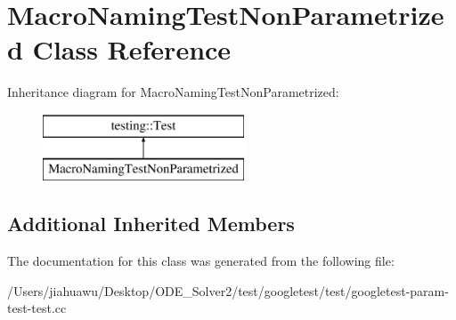 \hypertarget{class_macro_naming_test_non_parametrized}{}\section{Macro\+Naming\+Test\+Non\+Parametrized Class Reference}
\label{class_macro_naming_test_non_parametrized}
Inheritance diagram for Macro\+Naming\+Test\+Non\+Parametrized\+:\begin{figure}[H]
\begin{center}
\leavevmode
\includegraphics[height=2.000000cm]{class_macro_naming_test_non_parametrized}
\end{center}
\end{figure}
\subsection*{Additional Inherited Members}


The documentation for this class was generated from the following file\+:\begin{DoxyCompactItemize}
\item 
/\+Users/jiahuawu/\+Desktop/\+O\+D\+E\+\_\+\+Solver2/test/googletest/test/googletest-\/param-\/test-\/test.\+cc\end{DoxyCompactItemize}
